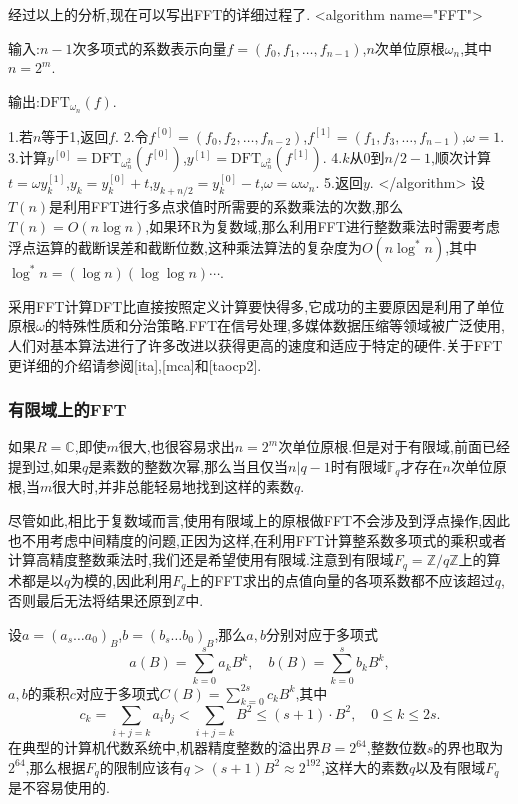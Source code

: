 \documentclass{ctexart}
\newcommand\mtcasCite[1]{[#1]}
\begin{document}
经过以上的分析,现在可以写出FFT的详细过程了.
<algorithm  name="FFT">

输入:$n-1$次多项式的系数表示向量$f=(f_0,f_1,\ldots,f_{n-1})$,$n$次单位原根$\omega_n$,其中$n=2^m$.

输出:$\mathrm{DFT}_{\omega_n}(f)$.

 1.若$n$等于1,返回$f$.
 2.令$f^{[0]}=(f_0,f_2,\ldots,f_{n-2})$,$f^{[ 1]}=(f_1,f_3,\ldots,f_{n-1})$,$\omega=1$.
 3.计算$y^{[0]}=\mathrm{DFT}_{\omega_n^2}(f^{[0]})$,$y^{[ 1]}=\mathrm{DFT}_{\omega_n^2}(f^{[ 1]})$.
 4.$k$从0到$n/2-1$,顺次计算$t=\omega y_k^{[ 1]}$,$y_k=y_k^{[0]}+t$,$y_{k+n/2}=y_k^{[0]}-t$,$\omega=\omega\omega_n$.
 5.返回$y$.
</algorithm>
设$T(n)$是利用FFT进行多点求值时所需要的系数乘法的次数,那么$T(n)=O(n\log{n})$,如果环R为复数域,那么利用FFT进行整数乘法时需要考虑浮点运算的截断误差和截断位数,这种乘法算法的复杂度为$O(n\log^*{n})$,其中$\log^*{n}=(\log{n})(\log{\log{n}})\cdots$.

采用FFT计算DFT比直接按照定义计算要快得多,它成功的主要原因是利用了单位原根$\omega$的特殊性质和分治策略.FFT在信号处理,多媒体数据压缩等领域被广泛使用,人们对基本算法进行了许多改进以获得更高的速度和适应于特定的硬件.关于FFT更详细的介绍请参阅\mtcasCite{ita},\mtcasCite{mca}和\mtcasCite{taocp2}.

\subsubsection{有限域上的FFT}

如果$R=\mathbb{C}$,即使$m$很大,也很容易求出$n=2^m$次单位原根.但是对于有限域,前面已经提到过,如果$q$是素数的整数次幂,那么当且仅当$n|q-1$时有限域$\mathbb{F}_q$才存在$n$次单位原根,当$m$很大时,并非总能轻易地找到这样的素数$q$.

尽管如此,相比于复数域而言,使用有限域上的原根做FFT不会涉及到浮点操作,因此也不用考虑中间精度的问题,正因为这样,在利用FFT计算整系数多项式的乘积或者计算高精度整数乘法时,我们还是希望使用有限域.注意到有限域$F_q=\mathbb{Z}/q\mathbb{Z}$上的算术都是以$q$为模的,因此利用$F_q$上的FFT求出的点值向量的各项系数都不应该超过$q$,否则最后无法将结果还原到$\mathbb{Z}$中.

设$a=(a_s\ldots a_0)_B$,$b=(b_s\ldots b_0)_B$,那么$a,b$分别对应于多项式$$a(B)=\sum_{k=0}^sa_kB^k,\quad b(B)=\sum_{k=0}^sb_kB^k,$$
$a,b$的乘积$c$对应于多项式$C(B)=\sum\limits_{k=0}^{2s}c_kB^k$,其中$$c_k=\sum_{i+j=k}a_ib_j<\sum_{i+j=k}B^2\le(s+1)\cdot B^2,\quad 0\le k\le 2s.$$在典型的计算机代数系统中,机器精度整数的溢出界$B=2^{64}$,整数位数$s$的界也取为$2^{64}$,那么根据$F_q$的限制应该有$q>(s+1)B^2\approx 2^{192}$,这样大的素数$q$以及有限域$F_q$是不容易使用的.
\end{document}
